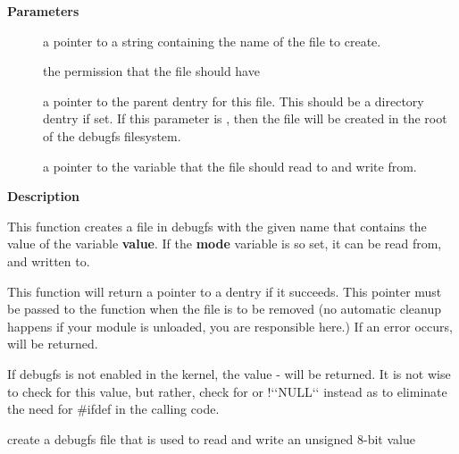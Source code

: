 \documentclass[a4paper,8pt,english]{sphinxmanual}
\begin{document}
\textbf{Parameters}
\begin{description}
\item[{}] \leavevmode
a pointer to a string containing the name of the file to create.

\item[{}] \leavevmode
the permission that the file should have

\item[{}] \leavevmode
a pointer to the parent dentry for this file.  This should be a
directory dentry if set.  If this parameter is , then the
file will be created in the root of the debugfs filesystem.

\item[{}] \leavevmode
a pointer to the variable that the file should read to and write
from.

\end{description}

\textbf{Description}

This function creates a file in debugfs with the given name that
contains the value of the variable \textbf{value}.  If the \textbf{mode} variable is so
set, it can be read from, and written to.

This function will return a pointer to a dentry if it succeeds.  This
pointer must be passed to the {\hyperref[filesystems/index:c.debugfs_remove]{\emph{}}} function when the file is
to be removed (no automatic cleanup happens if your module is unloaded,
you are responsible here.)  If an error occurs,  will be returned.

If debugfs is not enabled in the kernel, the value - will be
returned.  It is not wise to check for this value, but rather, check for
 or !{}`{}`NULL{}`{}` instead as to eliminate the need for \#ifdef in the calling
code.

\begin{fulllineitems}
\label{filesystems/index:c.debugfs_create_x8}
create a debugfs file that is used to read and write an unsigned 8-bit value

\end{fulllineitems}
\end{document}
